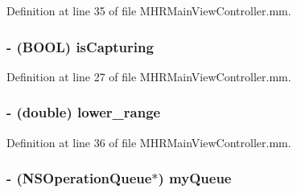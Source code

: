 Definition at line 35 of file M\+H\+R\+Main\+View\+Controller.\+mm.

\hypertarget{category_m_h_r_main_view_controller_07_08_a0b32e144ea6d386ce5180a75b7f1ac76}{
\subsubsection[{is\+Capturing}]{\setlength{\rightskip}{0pt plus 5cm}-\/ (B\+O\+O\+L) is\+Capturing\hspace{0.3cm}{\ttfamily [protected]}}}\label{category_m_h_r_main_view_controller_07_08_a0b32e144ea6d386ce5180a75b7f1ac76}


Definition at line 27 of file M\+H\+R\+Main\+View\+Controller.\+mm.

\hypertarget{category_m_h_r_main_view_controller_07_08_ac4984c4b9f2c0ed7a71d957858a0b690}{
\subsubsection[{lower\+\_\+range}]{\setlength{\rightskip}{0pt plus 5cm}-\/ (double) lower\+\_\+range\hspace{0.3cm}{\ttfamily [protected]}}}\label{category_m_h_r_main_view_controller_07_08_ac4984c4b9f2c0ed7a71d957858a0b690}


Definition at line 36 of file M\+H\+R\+Main\+View\+Controller.\+mm.

\hypertarget{category_m_h_r_main_view_controller_07_08_a77f4256f36d6f6bebf7f82005aec1c62}{
\subsubsection[{my\+Queue}]{\setlength{\rightskip}{0pt plus 5cm}-\/ (N\+S\+Operation\+Queue$\ast$) my\+Queue\hspace{0.3cm}{\ttfamily [protected]}}}\label{category_m_h_r_main_view_controller_07_08_a77f4256f36d6f6bebf7f82005aec1c62}


